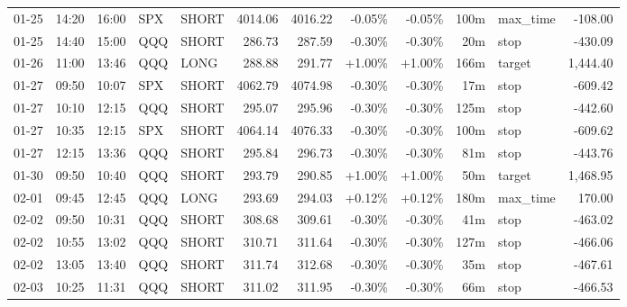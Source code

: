 \documentclass[11pt,a4paper]{article}
\begin{document}
\begin{center}
\begin{longtable}{>{\color{txtmain}}l l l l l r r r r r >{\color{txtmain}}l r}
01-25 & 14:20 & 16:00 & SPX & SHORT & 4014.06 & 4016.22 & \textcolor{lossred}{-0.05\%} & \textcolor{lossred}{-0.05\%} & 100m & max\_time & \textcolor{lossred}{-108.00} \\
01-25 & 14:40 & 15:00 & QQQ & SHORT & 286.73 & 287.59 & \textcolor{lossred}{-0.30\%} & \textcolor{lossred}{-0.30\%} & 20m & stop & \textcolor{lossred}{-430.09} \\
01-26 & 11:00 & 13:46 & QQQ & LONG & 288.88 & 291.77 & \textcolor{wingreen}{+1.00\%} & \textcolor{wingreen}{+1.00\%} & 166m & target & \textcolor{wingreen}{1,444.40} \\
01-27 & 09:50 & 10:07 & SPX & SHORT & 4062.79 & 4074.98 & \textcolor{lossred}{-0.30\%} & \textcolor{lossred}{-0.30\%} & 17m & stop & \textcolor{lossred}{-609.42} \\
01-27 & 10:10 & 12:15 & QQQ & SHORT & 295.07 & 295.96 & \textcolor{lossred}{-0.30\%} & \textcolor{lossred}{-0.30\%} & 125m & stop & \textcolor{lossred}{-442.60} \\
01-27 & 10:35 & 12:15 & SPX & SHORT & 4064.14 & 4076.33 & \textcolor{lossred}{-0.30\%} & \textcolor{lossred}{-0.30\%} & 100m & stop & \textcolor{lossred}{-609.62} \\
01-27 & 12:15 & 13:36 & QQQ & SHORT & 295.84 & 296.73 & \textcolor{lossred}{-0.30\%} & \textcolor{lossred}{-0.30\%} & 81m & stop & \textcolor{lossred}{-443.76} \\
01-30 & 09:50 & 10:40 & QQQ & SHORT & 293.79 & 290.85 & \textcolor{wingreen}{+1.00\%} & \textcolor{wingreen}{+1.00\%} & 50m & target & \textcolor{wingreen}{1,468.95} \\
02-01 & 09:45 & 12:45 & QQQ & LONG & 293.69 & 294.03 & \textcolor{wingreen}{+0.12\%} & \textcolor{wingreen}{+0.12\%} & 180m & max\_time & \textcolor{wingreen}{170.00} \\
02-02 & 09:50 & 10:31 & QQQ & SHORT & 308.68 & 309.61 & \textcolor{lossred}{-0.30\%} & \textcolor{lossred}{-0.30\%} & 41m & stop & \textcolor{lossred}{-463.02} \\
02-02 & 10:55 & 13:02 & QQQ & SHORT & 310.71 & 311.64 & \textcolor{lossred}{-0.30\%} & \textcolor{lossred}{-0.30\%} & 127m & stop & \textcolor{lossred}{-466.06} \\
02-02 & 13:05 & 13:40 & QQQ & SHORT & 311.74 & 312.68 & \textcolor{lossred}{-0.30\%} & \textcolor{lossred}{-0.30\%} & 35m & stop & \textcolor{lossred}{-467.61} \\
02-03 & 10:25 & 11:31 & QQQ & SHORT & 311.02 & 311.95 & \textcolor{lossred}{-0.30\%} & \textcolor{lossred}{-0.30\%} & 66m & stop & \textcolor{lossred}{-466.53} \\

\end{longtable}
\end{center}
\end{document}
